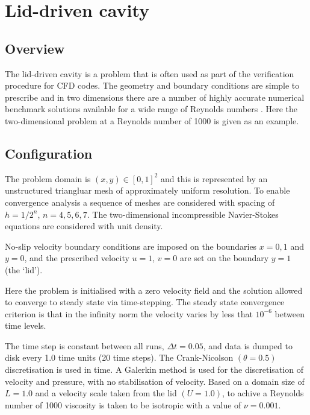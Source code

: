 \section{Lid-driven cavity}
\label{sect:lid_driven_cavity}

\subsection{Overview}
The lid-driven cavity is a problem that is often used as part of the verification procedure for
CFD codes. The geometry and boundary conditions are simple to prescribe and in
two dimensions there are a number of highly accurate numerical benchmark solutions
available for a wide range of Reynolds numbers \citep{botella1998,erturk2005,bruneau2006}. 
Here the two-dimensional problem at a Reynolds number of 1000 is given as an example.

\subsection{Configuration}
The problem domain is $(x,y) \in [0,1]^2$ and this is represented by an unstructured triangluar mesh
of approximately uniform resolution. To enable convergence analysis a sequence of meshes are considered
with spacing of $h=1/2^n$, $n=4,5,6,7$. The two-dimensional incompressible Navier-Stokes equations are
considered with unit density.

No-slip velocity boundary conditions are imposed on the boundaries $x=0,1$ and $y=0$, 
and the prescribed velocity $u=1$, $v=0$ are set on the boundary $y=1$ (the `lid'). 

Here the problem is initialised with a zero velocity field and the solution
allowed to converge to steady state via time-stepping. The steady state convergence criterion is
that in the infinity norm the velocity varies by less that $10^{-6}$ between time levels.

The time step is constant between all runs, $\Delta t = 0.05$, and data is dumped to disk every
1.0 time units (20 time steps). The Crank-Nicolson $(\theta=0.5)$ discretisation is used in time. 
A \Poo Galerkin method is used for the discretisation of velocity and pressure, with no stabilisation
of velocity. Based on a domain size of $L=1.0$ and a velocity scale taken from the lid $(U=1.0)$, to achive
a Reynolds number of 1000 viscosity is taken to be isotropic with a value of $\nu=0.001$.

 

